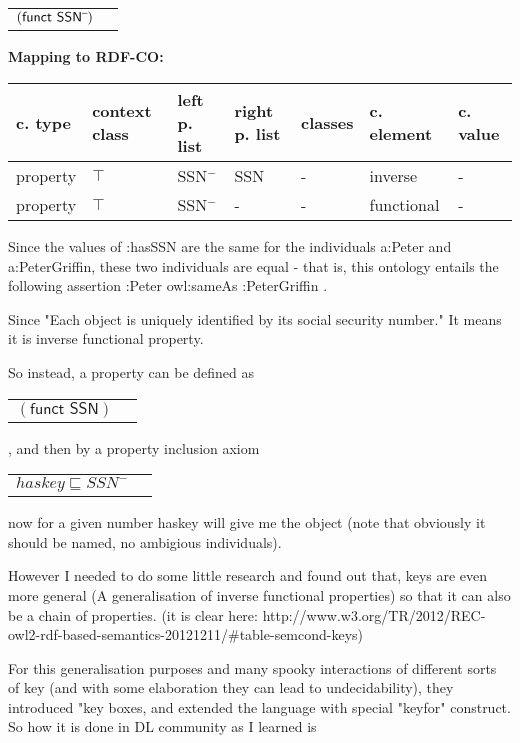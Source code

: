 \documentclass{llncs}
\newenvironment{gcotable}{
  \scriptsize
  \sffamily
  \vspace{0cm}
	\begin{center}
	\textbf{\vspace{0.4cm}Mapping to RDF-CO:} \\
  \begin{tabular}{l|l|l|l|l|l|l}
	\hline
  \textbf{c. type} & \textbf{context class} & \textbf{left p. list} & \textbf{right p. list} & \textbf{classes} & \textbf{c. element} & \textbf{c. value} \\
  \hline

}{
  \hline
  \end{tabular}
	\end{center}
}
\newenvironment{DL}{
  \vspace{0cm}
	\begin{center}
  \begin{tabular}{r l}

}{
  \end{tabular}
	\end{center}
}
\newcommand{\an}[1]{\todo[size=\small, color=green!40]{\textbf{Andy:} #1}}
\begin{document}
\begin{DL}
$(\textsf{funct } \textsf{SSN}\sp{\overline{\ }})$
\end{DL}

\begin{gcotable}
property & $\top$ & SSN$^{-}$ & SSN & - & inverse & - \\
property & $\top$ & SSN$^{-}$ & - & - & functional & - \\
\end{gcotable}

Since the values of :hasSSN are the same for the individuals a:Peter and a:PeterGriffin, these two individuals are equal - that is, this ontology entails the following assertion :Peter owl:sameAs :PeterGriffin . 

%

Since "Each object is uniquely identified by its social security number." It means it is inverse functional property.

So instead,  a property can be defined as 
\begin{DL}
$(\textsf{funct } \textsf{SSN})$
\end{DL}
, and then by a property inclusion axiom

\begin{DL}
$haskey \sqsubseteq SSN^{-}$
\end{DL}

now for a given number haskey will give me the object (note that obviously it should be named, no ambigious individuals).

However I needed to do some little research and found out that, keys are even more general (A generalisation of inverse functional properties) so that it can also be a chain of properties. (it is clear here: http://www.w3.org/TR/2012/REC-owl2-rdf-based-semantics-20121211/\#table-semcond-keys)

For this generalisation purposes and many spooky interactions of different sorts of key (and with some elaboration they can lead to undecidability), they introduced "key boxes, and extended the language with special "keyfor" construct. So how it is done in DL community as I learned is
\end{document}
